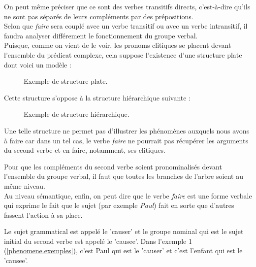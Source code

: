 On peut même préciser que ce sont des verbes transitifs directs, c'est-à-dire qu'ils ne sont pas séparés de leurs compléments par des prépositions.\\

Selon que \emph{faire} sera couplé avec un verbe transitif ou avec un verbe intransitif, il faudra analyser différement le fonctionnement du groupe verbal.\\

Puisque, comme on vient de le voir, les pronoms clitiques se placent devant l'ensemble du prédicat complexe, cela suppose l'existence d'une structure plate dont voici un modèle : \\

\begin{figure}[ht]
\centering
{}
\caption{Exemple de structure plate.}
\end{figure}

Cette structure s'oppose à la structure hiérarchique suivante :\\

\begin{figure}[ht]
\centering
{}
\caption{Exemple de structure hiérarchique.}
\end{figure}


Une telle structure ne permet pas d'illustrer les phénomènes auxquels nous avons à faire car dans un tel cas, le verbe \emph{faire} ne pourrait pas récupérer les arguments du second verbe et en faire, notamment, ses clitiques.

Pour que les compléments du second verbe soient pronominalisés devant l'ensemble du groupe verbal, il faut que toutes les branches de l'arbre soient au même niveau.\\

Au niveau sémantique, enfin, on peut dire que le verbe \emph{faire} est une forme verbale qui exprime le fait que le sujet (par exemple \emph{Paul}) fait en sorte que d'autres fassent l'action à sa place.

Le sujet grammatical est appelé le 'causer' et le groupe nominal qui est le sujet initial du second verbe est appelé le 'causee'.
Dans l'exemple 1 (\autoref{phenomene.exemples}), c'est Paul qui est le 'causer' et c'est l'enfant qui est le 'causee'.



